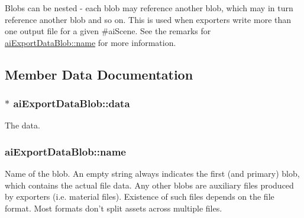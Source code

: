 Blobs can be nested -\/ each blob may reference another blob, which may in turn reference another blob and so on. This is used when exporters write more than one output file for a given \#ai\-Scene. See the remarks for \hyperlink{structai_export_data_blob_a22fbdb28a7ebc30b4d3c3339be18b5f2}{ai\-Export\-Data\-Blob\-::name} for more information. 

\subsection{Member Data Documentation}
\hypertarget{structai_export_data_blob_ac080c780dad92077b42447d77a1a9ed1}{
\subsubsection[{data}]{$\ast$ ai\-Export\-Data\-Blob\-::data}}\label{structai_export_data_blob_ac080c780dad92077b42447d77a1a9ed1}


The data. 

\hypertarget{structai_export_data_blob_a22fbdb28a7ebc30b4d3c3339be18b5f2}{
\subsubsection[{name}]{ ai\-Export\-Data\-Blob\-::name}}\label{structai_export_data_blob_a22fbdb28a7ebc30b4d3c3339be18b5f2}
Name of the blob. An empty string always indicates the first (and primary) blob, which contains the actual file data. Any other blobs are auxiliary files produced by exporters (i.\-e. material files). Existence of such files depends on the file format. Most formats don't split assets across multiple files.

